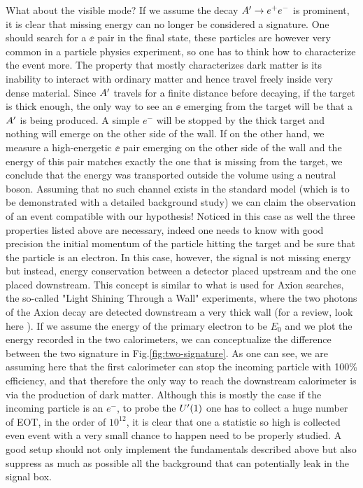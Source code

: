 What about the visible mode? If we assume the decay $A' \to e^+e^-$ is prominent, it is clear that missing energy can no longer be considered a signature. One should search for a $\ee$ pair in the final state, these particles are however very common in a particle physics experiment, so one has to think how to characterize the event more. The property that mostly characterizes dark matter is its inability to interact with ordinary matter and hence travel freely inside very dense material. Since $A'$ travels for a finite distance before decaying, if the target is thick enough, the only way to see an $\ee$ emerging from the target will be that a $A'$ is being produced. A simple $e^-$ will be stopped by the thick target and nothing will emerge on the other side of the wall. If on the other hand, we measure a high-energetic $\ee$ pair emerging on the other side of the wall and the energy of this pair matches exactly the one that is missing from the target, we conclude that the energy was transported outside the volume using a neutral boson. Assuming that no such channel exists in the standard model (which is to be demonstrated with a detailed background study) we can claim the observation of an event compatible with our hypothesis! Noticed in this case as well the three properties listed above are necessary, indeed one needs to know with good precision the initial momentum of the particle hitting the target and be sure that the particle is an electron. In this case, however, the signal is not missing energy but instead, energy conservation between a detector placed upstream and the one placed downstream. This concept is similar to what is used for Axion searches, the so-called "Light Shining Through a Wall" experiments, where the two photons of the Axion decay are detected downstream a very thick wall (for a review, look here \cite{Jaeckel:2010ni}).
If we assume the energy of the primary electron to be $E_0$ and we plot the energy recorded in the two calorimeters, we can conceptualize the difference between the two signature in Fig.\ref{fig:two-signature}. As one can see, we are assuming here that the first calorimeter can stop the incoming particle with 100\% efficiency, and that therefore the only way to reach the downstream calorimeter is via the production of dark matter. Although this is mostly the case if the incoming particle is an $e^-$, to probe the $U'(1)$ one has to collect a huge number of EOT, in the order of $10^{12}$, it is clear that one a statistic so high is collected even event with a very small chance to happen need to be properly studied. A good setup should not only implement the fundamentals described above but also suppress as much as possible all the background that can potentially leak in the signal box.

